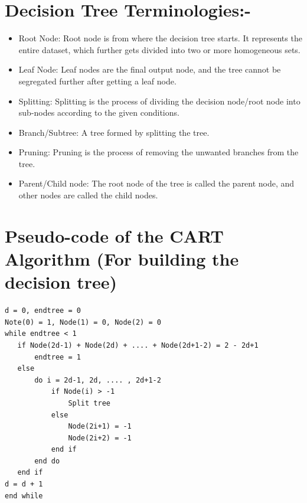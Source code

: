 \documentclass[12pt,a4paper]{report}
\begin{document}
\section*{Decision Tree Terminologies:-}
\begin{itemize}
\item Root Node: Root node is from where the decision tree starts. It represents the entire dataset, which further gets divided into two or more homogeneous sets.
\item Leaf Node: Leaf nodes are the final output node, and the tree cannot be segregated further after getting a leaf node.
\item Splitting: Splitting is the process of dividing the decision node/root node into sub-nodes according to the given conditions.
\item Branch/Subtree: A tree formed by splitting the tree.
\item Pruning: Pruning is the process of removing the unwanted branches from the tree.
\item Parent/Child node: The root node of the tree is called the parent node, and other nodes are called the child nodes.
\end{itemize}

\section*{Pseudo-code of the CART Algorithm (For building the decision tree)}
\begin{verbatim}
d = 0, endtree = 0
Note(0) = 1, Node(1) = 0, Node(2) = 0
while endtree < 1
   if Node(2d-1) + Node(2d) + .... + Node(2d+1-2) = 2 - 2d+1  
       endtree = 1
   else
       do i = 2d-1, 2d, .... , 2d+1-2
           if Node(i) > -1
               Split tree
           else
               Node(2i+1) = -1
               Node(2i+2) = -1
           end if
       end do
   end if
d = d + 1
end while
\end{verbatim}
\end{document}

